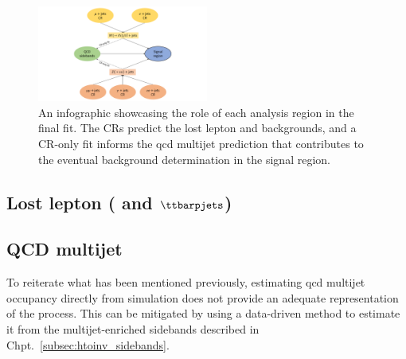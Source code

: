 
\begin{figure}[htbp]
    \centering
    \includegraphics[width=0.5\textwidth]{figures/fit_overview.pdf}
    \caption[An infographic showcasing the role of each analysis region in the final fit]{An infographic showcasing the role of each analysis region in the final fit. The \glspl{CR} predict the lost lepton and \ztonunu backgrounds, and a \gls{CR}-only fit informs the \acrshort{qcd} multijet prediction that contributes to the eventual background determination in the signal region.}
    \label{fig:htoinv_fit_overview}
\end{figure}




\subsection{Lost lepton (\texorpdfstring{\PW}{W} and \texorpdfstring{$\ttbarpjets$}{ttbar plus jets})}
\label{subsec:htoinv_lost_lepton_bkg}




\subsection{\texorpdfstring{\ztonunupjets}{Z to nunu + jets}}
\label{subsec:htoinv_znunu_bkg}




\subsection{QCD multijet}
\label{subsec:htoinv_qcd_multijet_bkg}

To reiterate what has been mentioned previously, estimating \acrshort{qcd} multijet occupancy directly from simulation does not provide an adequate representation of the process. This can be mitigated by using a data-driven method to estimate it from the multijet-enriched sidebands described in Chpt.~\ref{subsec:htoinv_sidebands}.

